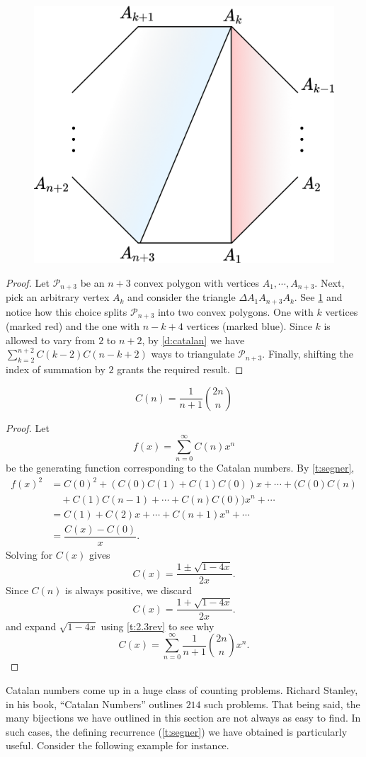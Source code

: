 \begin{figure}[H]
    \centering
    \includegraphics[width=0.45\linewidth]{Images/Figure16.png}
    \caption{}
    \label{f:3.26}
\end{figure}
\begin{proof}
Let $\mathcal{P}_{n+3}$ be an $n+3$ convex polygon with vertices $A_1,\cdots,A_{n+3}$. Next, pick an arbitrary vertex $A_k$ and consider the triangle $\Delta A_1A_{n+3}A_{k}$. See \cref{f:3.26} and notice how this choice splits $\mathcal{P}_{n+3}$ into two convex polygons. One with $k$ vertices (marked red) and the one with $n-k+4$ vertices (marked blue). Since $k$ is allowed to vary from $2$ to $n+2$, by \cref{d:catalan} we have $\sum_{k=2}^{n+2}C(k-2)C(n-k+2)$ ways to triangulate $\mathcal{P}_{n+3}$. Finally, shifting the index of summation by $2$ grants the required result. 
\end{proof}
\begin{claim}
\[
C(n) = \dfrac{1}{n+1}\binom{2n}{n}
\]
\end{claim}
\begin{proof}
Let \[f(x) = \sum_{n=0}^{\infty}C(n)x^n\] be the generating function corresponding to the Catalan numbers. By \cref{t:segner},
\begin{align*}
    f(x)^2 &= C(0)^2 + (C(0)C(1)+C(1)C(0))x + \cdots + (C(0)C(n)\\ &\quad +C(1)C(n-1)+\cdots+C(n)C(0))x^n + \cdots \\
    &= C(1)+C(2)x+\cdots+C(n+1)x^n+\cdots \\
    &= \dfrac{C(x)-C(0)}{x}.
\end{align*}
Solving for $C(x)$ gives \[
C(x) = \dfrac{1\pm \sqrt{1-4x}}{2x}.
\]
Since $C(n)$ is always positive, we discard \[
C(x) = \dfrac{1+ \sqrt{1-4x}}{2x}.
\] and expand $\sqrt{1-4x}$ using \cref{t:2.3rev} to see why 
\[
C(x) = \sum_{n=0}^{\infty}\dfrac{1}{n+1}\binom{2n}{n}x^n.
\]
\end{proof}
\begin{remark}
Catalan numbers come up in a huge class of counting problems. Richard Stanley, in his book, ``Catalan Numbers'' outlines $214$ such problems. That being said, the many bijections we have outlined in this section are not always as easy to find. In such cases, the defining recurrence (\cref{t:segner}) we have obtained is particularly useful. Consider the following example for instance.
\end{remark}
